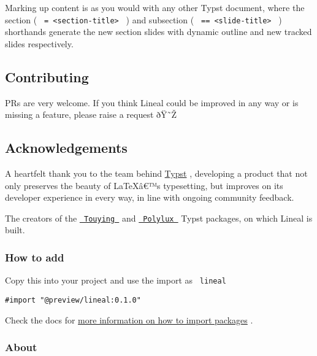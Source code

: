 Marking up content is as you would with any other Typst document, where
the section ( \texttt{\ =\ \textless{}section-title\textgreater{}\ } )
and subsection ( \texttt{\ ==\ \textless{}slide-title\textgreater{}\ } )
shorthands generate the new section slides with dynamic outline and new
tracked slides respectively.

\subsection{Contributing}\label{contributing}

PRs are very welcome. If you think Lineal could be improved in any way
or is missing a feature, please raise a request ðŸ˜Ž

\subsection{Acknowledgements}\label{acknowledgements}

A heartfelt thank you to the team behind
\href{https://github.com/typst/typst}{Typst} , developing a product that
not only preserves the beauty of LaTeXâ€™s typesetting, but improves on
its developer experience in every way, in line with ongoing community
feedback.

The creators of the
\href{https://github.com/touying-typ/touying}{\texttt{\ Touying\ }} and
\href{https://github.com/andreasKroepelin/polylux}{\texttt{\ Polylux\ }}
Typst packages, on which Lineal is built.

\subsubsection{How to add}\label{how-to-add}

Copy this into your project and use the import as \texttt{\ lineal\ }

\begin{verbatim}
#import "@preview/lineal:0.1.0"
\end{verbatim}



Check the docs for
\href{https://typst.app/docs/reference/scripting/\#packages}{more
information on how to import packages} .

\subsubsection{About}\label{about}

